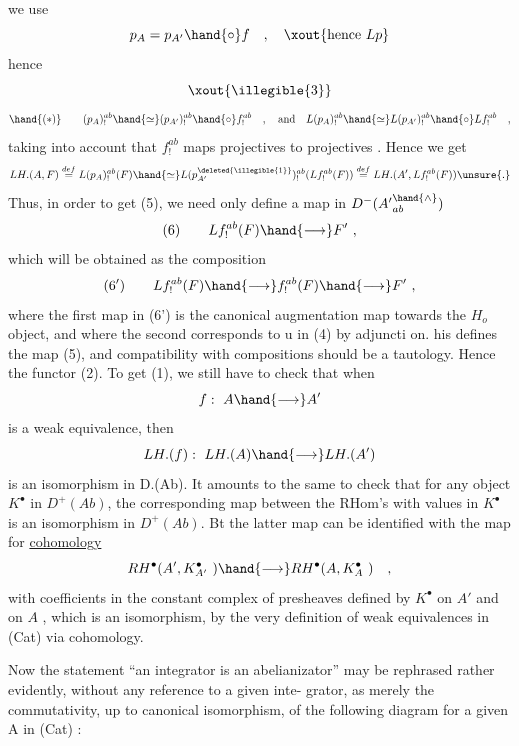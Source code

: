 
we use
\[ p_A = p_{A'} \hand{\circ} f \quad , \quad \xout{\text{hence }Lp} \]
hence
\[ \xout{\illegible{3}} \]
\[ \hand{(*)} \qquad (p_A)_!^{ab} \hand{\simeq} (p_{A'})_!^{ab} \hand{\circ} f_!^{ab} \quad , \quad \text{and} \quad L(p_A)_!^{ab} \hand{\simeq} L(p_{A'})_!^{ab} \hand{\circ} Lf_!^{ab} \quad , \]
taking into account that $f_!^{ab}$ maps projectives to projectives . Hence
we get
\[ LH.(A,F) \overset{def}{=} L(p_A)_!^{ab}(F) \hand{\simeq} L(p^{\deleted{\illegible{1}}}_{A'})_!^{ab}(Lf_!^{ab}(F)) \overset{def}{=} LH.(A',Lf_!^{ab}(F)) \unsure{.} \]
Thus, in order to get (5), we need only define a map in $D^-(A'{}^{\hand{\wedge}}_{ab})$
\[ (6) \qquad Lf_!^{ab}(F) \hand{\longrightarrow} F' \ , \]
which will be obtained as the composition
\[ (6') \qquad Lf_!^{ab}(F) \hand{\longrightarrow} f_!^{ab}(F) \hand{\longrightarrow} F' \ , \]
where the first map in (6') is the canonical augmentation map towards
the $H_o$ object, and where the second corresponds to u in (4) by adjuncti%
on. his defines the map (5), and compatibility with compositions
should be a tautology. Hence the functor (2). To get (1), we still
have to check that when
\[ f: \ A \hand{\longrightarrow} A' \]
is a weak equivalence, then
\[ LH.(f): \ LH.(A) \hand{\longrightarrow} LH.(A') \]
is an isomorphism in D.(Ab). It amounts to the same to check that for
any object $K^\bullet$ in $D^+(Ab)$, the corresponding map between the RHom's
with values in $K^\bullet$ is  an isomorphism in $D^+(Ab)$. Bt 
the latter map can be identified with the map for \uline{cohomology}
\[ RH^\bullet(A',K^\bullet_{A'} \ ) \hand{\longrightarrow} RH^\bullet(A, K^\bullet_A \ ) \quad , \]
with coefficients in the constant complex of presheaves defined by $K^\bullet$
on $A'$ and on $A$ , which is an isomorphism, by the very definition
of weak equivalences in (Cat) via cohomology.

Now the statement ``an integrator  is an abelianizator'' may
be rephrased rather evidently, without any reference to a given inte-%
grator, as  merely the commutativity, up to canonical isomorphism,
of the  following diagram for a given A in (Cat) :


